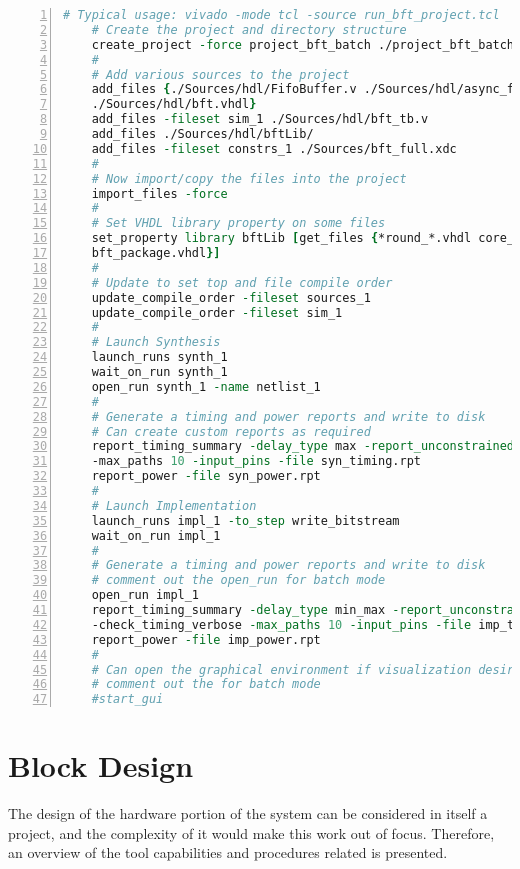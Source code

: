 \begin{lstlisting}[language=tcl, basicstyle=\scriptsize\ttfamily, tabsize=2,
	commentstyle=\color{darkgray}, keywordstyle=\color{blue}, backgroundcolor=\color{lightgray},
	morekeywords={create_project, add_files, import_files, set_property, update_compile_order,
	launch_runs, wait_on_run, open_run, report_timming_summary, report_power}, breaklines=true,
	numbers=left, float=htb,
	caption={[TCL project creation example]TCL project creation example, from \cite{UG895}},
	label={tcl-script}]
	# Typical usage: vivado -mode tcl -source run_bft_project.tcl
	# Create the project and directory structure
	create_project -force project_bft_batch ./project_bft_batch -part xc7z010-clg225-1
	#
	# Add various sources to the project
	add_files {./Sources/hdl/FifoBuffer.v ./Sources/hdl/async_fifo.v \
	./Sources/hdl/bft.vhdl}
	add_files -fileset sim_1 ./Sources/hdl/bft_tb.v
	add_files ./Sources/hdl/bftLib/
	add_files -fileset constrs_1 ./Sources/bft_full.xdc
	#
	# Now import/copy the files into the project
	import_files -force
	#
	# Set VHDL library property on some files
	set_property library bftLib [get_files {*round_*.vhdl core_transform.vhdl \
	bft_package.vhdl}]
	#
	# Update to set top and file compile order
	update_compile_order -fileset sources_1
	update_compile_order -fileset sim_1
	#
	# Launch Synthesis
	launch_runs synth_1
	wait_on_run synth_1
	open_run synth_1 -name netlist_1
	#
	# Generate a timing and power reports and write to disk
	# Can create custom reports as required
	report_timing_summary -delay_type max -report_unconstrained -check_timing_verbose \
	-max_paths 10 -input_pins -file syn_timing.rpt
	report_power -file syn_power.rpt
	#
	# Launch Implementation
	launch_runs impl_1 -to_step write_bitstream
	wait_on_run impl_1
	#
	# Generate a timing and power reports and write to disk
	# comment out the open_run for batch mode
	open_run impl_1
	report_timing_summary -delay_type min_max -report_unconstrained \
	-check_timing_verbose -max_paths 10 -input_pins -file imp_timing.rpt
	report_power -file imp_power.rpt
	#
	# Can open the graphical environment if visualization desired
	# comment out the for batch mode
	#start_gui
\end{lstlisting}

\section{Block Design} \label{block-design}

The design of the hardware portion of the system can be considered in itself a project, and the
complexity of it would make this work out of focus. Therefore, an overview of the tool capabilities
and procedures related is presented.

